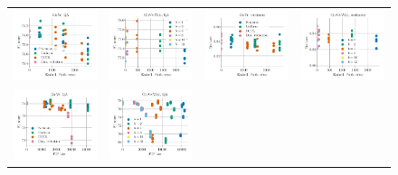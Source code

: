 \begin{figure}
	\centering
	\begin{tabular}{@{\hskip -0.0in}c@{\hskip -0.0in}c@{\hskip -0.0in}c@{\hskip -0.0in}c@{\hskip -0.0in}}
		\includegraphics[width=.245\linewidth]{figures/glove400k_qa_best-f1_vs_embed-frob-error_linx.pdf} &
		\includegraphics[width=.245\linewidth]{figures/glove-wiki400k-am_qa_best-f1_vs_embed-frob-error_linx.pdf} &
		\includegraphics[width=.245\linewidth]{figures/glove400k_sentiment_sst_test-acc_vs_embed-frob-error_linx.pdf} &
		\includegraphics[width=.245\linewidth]{figures/glove-wiki400k-am_sentiment_sst_test-acc_vs_embed-frob-error_linx.pdf} \\
		\includegraphics[width=.245\linewidth]{figures/glove400k_qa_best-f1_vs_gram-large-dim-frob-error_linx.pdf} &
		\includegraphics[width=.245\linewidth]{figures/glove-wiki400k-am_qa_best-f1_vs_gram-large-dim-frob-error_linx.pdf} &

\end{tabular}
\end{figure}
